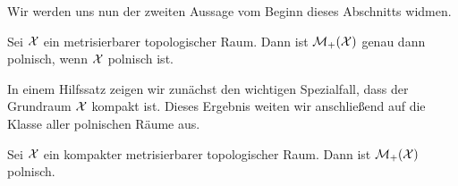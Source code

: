 \documentclass[../thesis/thesis.tex]{subfiles}
\begin{document}
	Wir werden uns nun der zweiten Aussage vom Beginn dieses Abschnitts widmen. 
	
	\begin{Satz}
		\label{satz:übertragung_polnizität}
		Sei $\mathcal{X}$ ein metrisierbarer topologischer Raum. Dann ist $\mathcal{M}_{+}(\mathcal{X})$ genau dann polnisch, wenn $\mathcal{X}$ polnisch ist.
	\end{Satz}
	
	In einem Hilfssatz zeigen wir zunächst den wichtigen Spezialfall, dass der Grundraum $\mathcal{X}$ kompakt ist. Dieses Ergebnis weiten wir anschließend auf die Klasse aller polnischen Räume aus.

	\begin{Hilfssatz}
		\label{hilfssatz:übertragung_polnizität_kompakter_grundraum}
		Sei $\mathcal{X}$ ein kompakter metrisierbarer topologischer Raum. Dann ist $\mathcal{M}_{+}(\mathcal{X})$ polnisch.
	\end{Hilfssatz}
	
\end{document}

